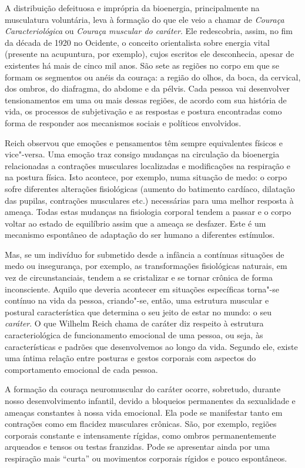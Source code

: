 A distribuição defeituosa e imprópria da bioenergia, principalmente na
musculatura voluntária, leva à formação do que ele veio a chamar de
\emph{Couraça Caracteriológica} ou \emph{Couraça muscular do caráter}.
Ele redescobria, assim, no fim da década de 1920 no Ocidente, o
conceito orientalista sobre energia vital (presente na acupuntura, por
exemplo), cujos escritos ele desconhecia, apesar de existentes há mais
de cinco mil anos. São sete as regiões no corpo em que se formam os
segmentos ou anéis da couraça: a região do olhos, da boca, da cervical,
dos ombros, do diafragma, do abdome e da pélvis. Cada pessoa vai
desenvolver tensionamentos em uma ou mais dessas regiões, de acordo com
sua história de vida, os processos de subjetivação e as respostas e
postura encontradas como forma de responder aos mecanismos sociais e
políticos envolvidos.

Reich observou que emoções e pensamentos têm sempre equivalentes físicos
e vice"-versa. Uma emoção traz consigo mudanças na circulação da
bioenergia relacionadas a contrações musculares localizadas e
modificações na respiração e na postura física. Isto acontece, por
exemplo, numa situação de medo: o corpo sofre diferentes alterações
fisiológicas (aumento do batimento cardíaco, dilatação das pupilas,
contrações musculares etc.) necessárias para uma melhor resposta à
ameaça. Todas estas mudanças na fisiologia corporal tendem a passar e o
corpo voltar ao estado de equilíbrio assim que a ameaça se desfazer.
Este é um mecanismo espontâneo de adaptação do ser humano a diferentes
estímulos.

Mas, se um indivíduo for submetido desde a infância a contínuas
situações de medo ou insegurança, por exemplo, as transformações
fisiológicas naturais, em vez de circunstanciais, tendem a se
cristalizar e se tornar crônica de forma inconsciente. Aquilo que
deveria acontecer em situações específicas torna"-se contínuo na vida da
pessoa, criando"-se, então, uma estrutura muscular e postural
característica que determina o seu jeito de estar no mundo: o seu
\emph{caráter}. O que Wilhelm Reich chama de caráter diz respeito à
estrutura caracteriológica de funcionamento emocional de uma pessoa, ou
seja, às características e padrões que desenvolvemos ao longo da vida.
Segundo ele, existe uma íntima relação entre posturas e gestos corporais
com aspectos do comportamento emocional de cada pessoa.

A formação da couraça neuromuscular do caráter ocorre, sobretudo,
durante nosso desenvolvimento infantil, devido a bloqueios permanentes
da sexualidade e ameaças constantes à nossa vida emocional. Ela pode se
manifestar tanto em contrações como em flacidez musculares crônicas.
São, por exemplo, regiões corporais constante e intensamente rígidas,
como ombros permanentemente arqueados e tensos ou testas franzidas. Pode
se apresentar ainda por uma respiração mais ``curta'' ou movimentos
corporais rígidos e pouco espontâneos.

